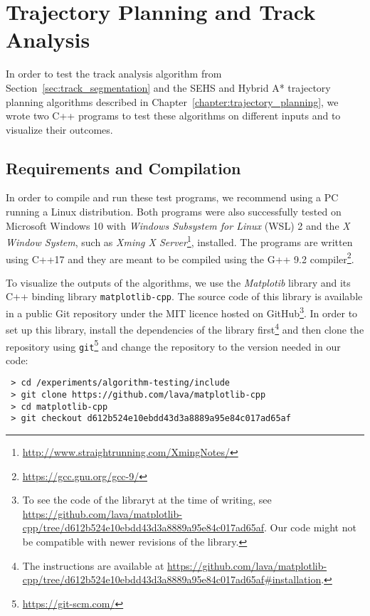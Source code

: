 \section{Trajectory Planning and Track Analysis}

In order to test the track analysis algorithm from Section~\ref{sec:track_segmentation} and the \gls{SEHS} and Hybrid A* trajectory planning algorithms described in Chapter~\ref{chapter:trajectory_planning}, we wrote two C++ programs to test these algorithms on different inputs and to visualize their outcomes.

\subsection{Requirements and Compilation}

In order to compile and run these test programs, we recommend using a PC running a Linux distribution. Both programs were also successfully tested on Microsoft Windows 10 with \textit{Windows Subsystem for Linux} (WSL) 2 and the \textit{X Window System}, such as \textit{Xming X Server}\footnote{\url{http://www.straightrunning.com/XmingNotes/}}, installed. The programs are written using C++17 and they are meant to be compiled using the G++ 9.2 compiler\footnote{\url{https://gcc.gnu.org/gcc-9/}}.

To visualize the outputs of the algorithms, we use the \textit{Matplotib} library and its C++ binding library \texttt{matplotlib-cpp}. The source code of this library is available in a public Git repository under the MIT licence hosted on GitHub\footnote{To see the code of the libraryt at the time of writing, see \url{https://github.com/lava/matplotlib-cpp/tree/d612b524e10ebdd43d3a8889a95e84c017ad65af}. Our code might not be compatible with newer revisions of the library.}. In order to set up this library, install the dependencies of the library first\footnote{The instructions are available at \url{https://github.com/lava/matplotlib-cpp/tree/d612b524e10ebdd43d3a8889a95e84c017ad65af#installation}.} and then clone the repository using \texttt{git}\footnote{\url{https://git-scm.com/}} and change the repository to the version needed in our code:

\begin{verbatim}
 > cd /experiments/algorithm-testing/include
 > git clone https://github.com/lava/matplotlib-cpp
 > cd matplotlib-cpp
 > git checkout d612b524e10ebdd43d3a8889a95e84c017ad65af
\end{verbatim}

